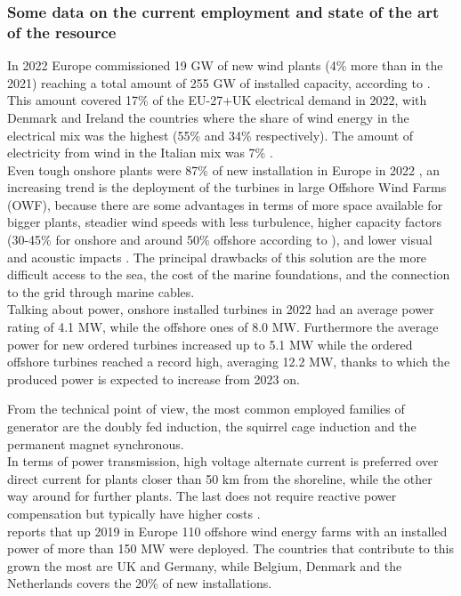 \subsubsection{Some data on the current employment and state of the art of the resource}
In 2022 Europe commissioned 19 $\si{\giga\watt}$ of new wind plants (4\% more than in the 2021) reaching a total amount of 255 $\si{\giga\watt}$ of installed capacity, according to \cite{wind_europe_data_2022}. This amount covered 17\% of the EU-27+UK electrical demand in 2022, with Denmark and Ireland the countries where the share of wind energy in the electrical mix was the highest (55\% and 34\% respectively). The amount of electricity from wind in the Italian mix was 7\% \cite{wind_europe_data_2022}.\\
Even tough onshore plants were 87\% of new installation in Europe in 2022 \cite{wind_europe_data_2022}, an increasing trend is the deployment of the turbines in large Offshore Wind Farms (OWF), because there are some advantages in terms of more space available for bigger plants, steadier wind speeds with less turbulence, higher capacity factors (30-45\% for onshore and around 50\% offshore according to \cite{wind_europe_data_2022}), and lower visual and acoustic impacts \cite{current_staus_and_future_trends_of_offshore_wind_power_in_europe}. The principal drawbacks of this solution are the more difficult access to the sea, the cost of the marine foundations, and the connection to the grid through marine cables.  \\
Talking about power, onshore installed turbines in 2022 had an average power rating of 4.1 $\si{\mega\watt}$, while the offshore ones of 8.0 $\si{\mega\watt}$. Furthermore the average power for new ordered turbines increased up to 5.1 $\si{\mega\watt}$ while the ordered offshore turbines reached a record high, averaging 12.2 $\si{\mega\watt}$, thanks to which the produced power is expected to increase from 2023 on.

From the technical point of view, the most common employed families of generator are the doubly fed induction, the squirrel cage induction and the permanent magnet synchronous.\\
In terms of power transmission, high voltage alternate current is preferred over direct current for plants closer than 50 km from the shoreline, while the other way around for further plants. The last does not require reactive power compensation but typically have higher costs \cite{current_staus_and_future_trends_of_offshore_wind_power_in_europe}.\\
\cite{current_staus_and_future_trends_of_offshore_wind_power_in_europe} reports that up 2019 in Europe 110 offshore wind energy farms with an installed power of more than 150 $\si{\mega\watt}$ were deployed. The countries that contribute to this grown the most are UK and Germany, while Belgium, Denmark and the Netherlands covers the 20\% of new installations.

